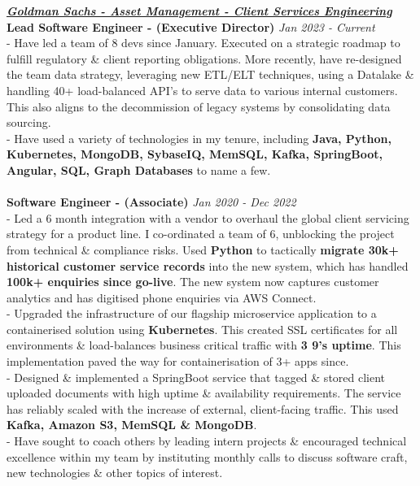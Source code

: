 \documentclass[a4paper,10pt]{article}
\begin{document}
	\textbf{\textit{\underline{Goldman Sachs - Asset Management - Client Services Engineering}}}
		\\\textbf{Lead Software Engineer - (Executive Director)}  \hfill \textit{Jan 2023 - Current }
		\\ - Have led a team of 8 devs since January. Executed on a strategic roadmap to fulfill regulatory \& client reporting obligations. More recently, have re-designed the team data strategy, leveraging new ETL/ELT techniques, using a Datalake \& handling 40+ load-balanced API's to serve data to various internal customers. This also aligns to the decommission of legacy systems by consolidating data sourcing.
		\\ - Have used a variety of technologies in my tenure, including \textbf{Java, Python, Kubernetes, MongoDB, SybaseIQ, MemSQL, Kafka, SpringBoot, Angular, SQL, Graph Databases} to name a few.
		\\\\
		\textbf{Software Engineer - (Associate)}  \hfill \textit{Jan 2020 - Dec 2022}
		\\ - Led a 6 month integration with a vendor to overhaul the global client servicing strategy for a product line. I co-ordinated a team of 6, unblocking the project from technical \& compliance risks. Used \textbf{Python} to tactically \textbf{migrate 30k+ historical customer service records} into the new system, which has handled \textbf{100k+ enquiries since go-live}. The new system now captures customer analytics and has digitised phone enquiries via AWS Connect.
		\\ - Upgraded the infrastructure of our flagship microservice application to a containerised solution using \textbf{Kubernetes}. This created SSL certificates for all environments \& load-balances business critical traffic with \textbf{3 9's uptime}. This implementation paved the way for containerisation of 3+ apps since.
		\\ - Designed \& implemented a SpringBoot service that tagged \& stored client uploaded documents with high uptime \& availability requirements. The service has reliably scaled with the increase of external, client-facing traffic. This used \textbf{Kafka, Amazon S3, MemSQL \& MongoDB}.
		\\ - Have sought to coach others by leading intern projects \& encouraged technical excellence within my team by instituting monthly calls to discuss software craft,  new technologies \& other topics of interest.
		\\\\
\end{document}
